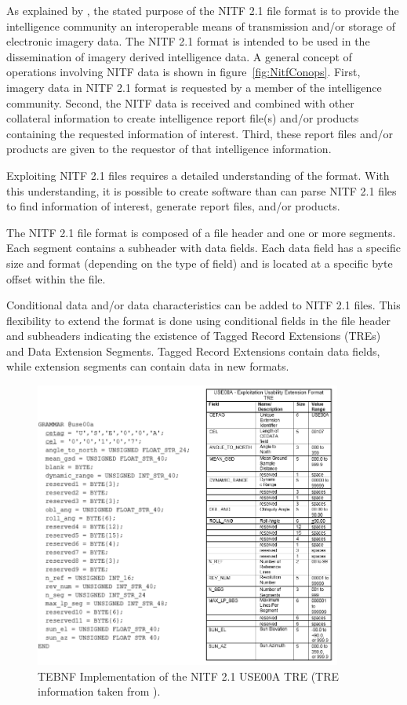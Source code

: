 \indent
As explained by \cite{2500c_01}, the stated purpose of the NITF 2.1 file format is to provide the intelligence community an interoperable means of transmission and/or storage of electronic imagery data.  The NITF 2.1 format is intended to be used in the dissemination of imagery derived intelligence data.  A general concept of operations involving NITF data is shown in figure~\ref{fig:NitfConops}.  First, imagery data in NITF 2.1 format is requested by a member of the intelligence community.  Second, the NITF data is received and combined with other collateral information to create intelligence report file(s) and/or products containing   the requested information of interest.  Third, these report files and/or products are given to the requestor of that intelligence information.

\indent
Exploiting NITF 2.1 files requires a detailed understanding of the format.  With this understanding, it is possible to create software than can parse NITF 2.1 files to find information of interest, generate report files, and/or products.

\indent
The NITF 2.1 file format is composed of a file header and one or more segments.  Each segment contains a subheader with data fields.  Each data field has a specific size and format (depending on the type of field) and is located at a specific byte offset within the file.

\indent
Conditional data and/or data characteristics can be added to NITF 2.1 files. This flexibility to extend the format is done using conditional fields in the file header and subheaders indicating the existence of Tagged Record Extensions (TREs) and Data Extension Segments.  Tagged Record Extensions contain data fields, while extension segments can contain data in new formats.

\begin{figure}[htbp]
\centering
\includegraphics[width=0.9\textwidth]{figures/TreComparison.png}
\caption[TEBNF Implementation of the NITF 2.1 USE00A TRE]{TEBNF Implementation of the NITF 2.1 USE00A TRE (TRE information taken from \cite{use001_01}).}
\label{fig:tre}
\end{figure}


